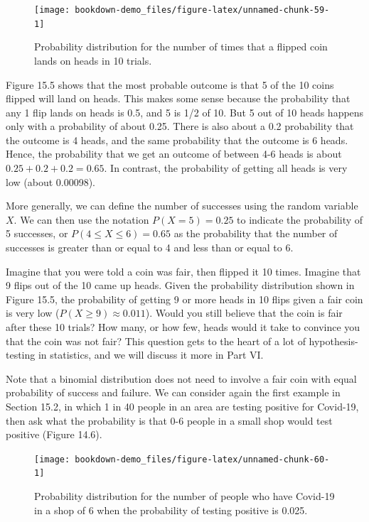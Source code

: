 \documentclass[
]{scrbook}
\begin{document}
\begin{figure}
\texttt{[image: bookdown-demo\_files/figure-latex/unnamed-chunk-59-1]} \caption{Probability distribution for the number of times that a flipped coin lands on heads in 10 trials.}\label{fig:unnamed-chunk-59}
\end{figure}

Figure 15.5 shows that the most probable outcome is that 5 of the 10 coins flipped will land on heads.
This makes some sense because the probability that any 1 flip lands on heads is 0.5, and 5 is 1/2 of 10.
But 5 out of 10 heads happens only with a probability of about 0.25.
There is also about a 0.2 probability that the outcome is 4 heads, and the same probability that the outcome is 6 heads.
Hence, the probability that we get an outcome of between 4-6 heads is about \(0.25 + 0.2 + 0.2 = 0.65\).
In contrast, the probability of getting all heads is very low (about 0.00098).

More generally, we can define the number of successes using the random variable \(X\).
We can then use the notation \(P(X = 5) = 0.25\) to indicate the probability of 5 successes, or \(P(4 \leq X \leq 6) = 0.65\) as the probability that the number of successes is greater than or equal to 4 and less than or equal to 6.

Imagine that you were told a coin was fair, then flipped it 10 times.
Imagine that 9 flips out of the 10 came up heads.
Given the probability distribution shown in Figure 15.5, the probability of getting 9 or more heads in 10 flips given a fair coin is very low (\(P(X \geq 9) \approx 0.011\)).
Would you still believe that the coin is fair after these 10 trials?
How many, or how few, heads would it take to convince you that the coin was not fair?
This question gets to the heart of a lot of hypothesis-testing in statistics, and we will discuss it more in Part VI.

Note that a binomial distribution does not need to involve a fair coin with equal probability of success and failure.
We can consider again the first example in Section 15.2, in which 1 in 40 people in an area are testing positive for Covid-19, then ask what the probability is that 0-6 people in a small shop would test positive (Figure 14.6).

\begin{figure}
\texttt{[image: bookdown-demo\_files/figure-latex/unnamed-chunk-60-1]} \caption{Probability distribution for the number of people who have Covid-19 in a shop of 6 when the probability of testing positive is 0.025.}\label{fig:unnamed-chunk-60}
\end{figure}
\end{document}
